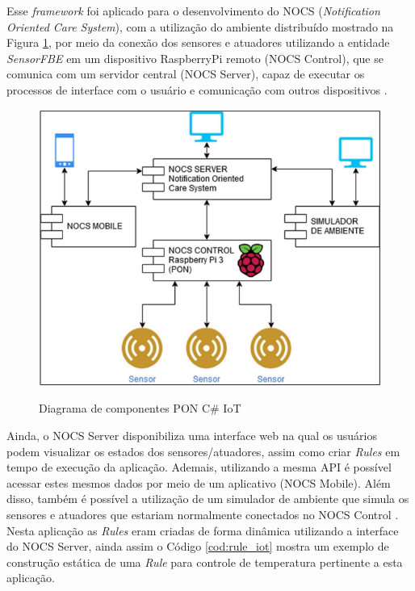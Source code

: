 Esse \textit{framework} foi aplicado para o desenvolvimento do NOCS
(\textit{Notification Oriented Care System}), com a utilização do ambiente
distribuído mostrado na Figura \ref{fig:pon_iot}, por meio da conexão dos
sensores e atuadores utilizando a entidade \textit{SensorFBE} em um dispositivo
RaspberryPi remoto (NOCS Control), que se comunica com um servidor central (NOCS
Server), capaz de executar os processos de interface com o usuário e comunicação
com outros dispositivos \cite{msc_oliveira_2019}. 

\begin{figure}[!htb]
  \centering
  \caption{Diagrama de componentes PON C\# IoT}
  \includegraphics[width=.55\textwidth]{../figures/pon_iot.png}
  \label{fig:pon_iot}
\end{figure}

Ainda, o NOCS Server disponibiliza uma interface web na qual os usuários podem
visualizar os estados dos sensores/atuadores, assim como criar \textit{Rules} em
tempo de execução da aplicação. Ademais, utilizando a mesma API é possível acessar
estes mesmos dados por meio de um aplicativo (NOCS Mobile). Além disso, também é
possível a utilização de um simulador de ambiente que simula os sensores e
atuadores que estariam normalmente conectados no NOCS Control
\cite{msc_oliveira_2019}. Nesta aplicação as \textit{Rules} eram criadas de forma
dinâmica utilizando a interface do NOCS Server, ainda assim o Código
\ref{cod:rule_iot} mostra um exemplo de construção estática de uma \textit{Rule}
para controle de temperatura pertinente a esta aplicação.

